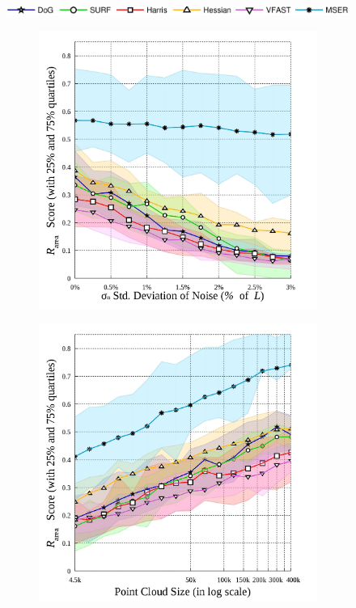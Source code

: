 \begin{figure}[ht]
	\centering 
	\includegraphics[width=0.70\linewidth]{./fig/eval/hlegend.jpg}
	\begin{subfigure}[t]{0.49\linewidth}
		\centering 
		\includegraphics[width=1\linewidth]{./fig/eval/graph_noise.jpg}
		\label{fig/eval/graph_noise}
	\end{subfigure}
	\begin{subfigure}[t]{0.49\linewidth}
		\centering 
		\includegraphics[width=1\linewidth]{./fig/eval/graph_sampling.jpg}

\end{subfigure}
\end{figure}
